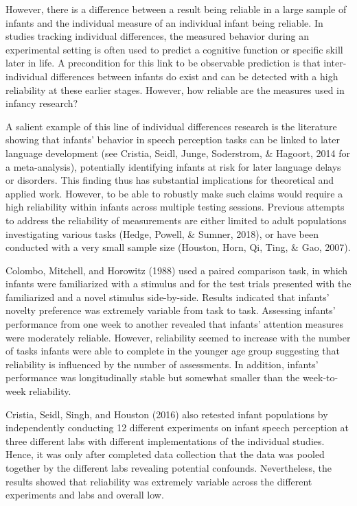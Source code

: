 \documentclass[
  english,
  man,floatsintext]{apa6}
\begin{document}
However, there is a difference between a result being reliable in a large sample of infants and the individual measure of an individual infant being reliable. In studies tracking individual differences, the measured behavior during an experimental setting is often used to predict a cognitive function or specific skill later in life. A precondition for this link to be observable prediction is that inter-individual differences between infants do exist and can be detected with a high reliability at these earlier stages. However, how reliable are the measures used in infancy research?

A salient example of this line of individual differences research is the literature showing that infants' behavior in speech perception tasks can be linked to later language development (see Cristia, Seidl, Junge, Soderstrom, \& Hagoort, 2014 for a meta-analysis), potentially identifying infants at risk for later language delays or disorders. This finding thus has substantial implications for theoretical and applied work. However, to be able to robustly make such claims would require a high reliability within infants across multiple testing sessions. Previous attempts to address the reliability of measurements are either limited to adult populations investigating various tasks (Hedge, Powell, \& Sumner, 2018), or have been conducted with a very small sample size (Houston, Horn, Qi, Ting, \& Gao, 2007).

Colombo, Mitchell, and Horowitz (1988) used a paired comparison task, in which infants were familiarized with a stimulus and for the test trials presented with the familiarized and a novel stimulus side-by-side. Results indicated that infants' novelty preference was extremely variable from task to task. Assessing infants' performance from one week to another revealed that infants' attention measures were moderately reliable. However, reliability seemed to increase with the number of tasks infants were able to complete in the younger age group suggesting that reliability is influenced by the number of assessments. In addition, infants' performance was longitudinally stable but somewhat smaller than the week-to-week reliability.

Cristia, Seidl, Singh, and Houston (2016) also retested infant populations by independently conducting 12 different experiments on infant speech perception at three different labs with different implementations of the individual studies. Hence, it was only after completed data collection that the data was pooled together by the different labs revealing potential confounds. Nevertheless, the results showed that reliability was extremely variable across the different experiments and labs and overall low.
\end{document}
